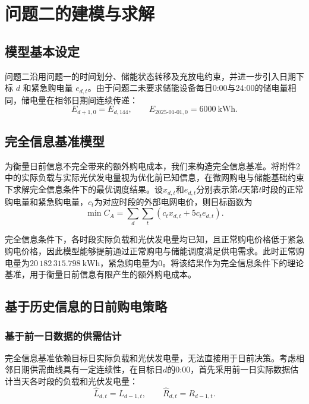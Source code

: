 \section{问题二的建模与求解}

\subsection{模型基本设定}

问题二沿用问题一的时间划分、储能状态转移及充放电约束，并进一步引入日期下标 $d$ 和紧急购电量 $e_{d,t}$。由于问题二未要求储能设备每日0:00与24:00的储电量相同，储电量在相邻日期间连续传递：
\begin{equation}
E_{d+1,0}=E_{d,144},
\qquad
E_{2025\text{-}01\text{-}01,0}=6000\ \mathrm{kWh}.
\label{eq:p2_crossday}
\end{equation}

\subsection{完全信息基准模型}

为衡量日前信息不完全带来的额外购电成本，我们来构造完全信息基准。将附件2中的实际负载与实际光伏发电量视为优化前已知信息，在微网购电与储能基础约束下求解完全信息条件下的最优调度结果。设$x_{d,t}$和$e_{d,t}$分别表示第$d$天第$t$时段的正常购电量和紧急购电量，$c_t$为对应时段的外部电网电价，则目标函数为
\begin{equation}
\min C_A=
\sum_{d}\sum_{t}
\left(c_t x_{d,t}+5c_t e_{d,t}\right).
\label{eq:p2_oracle}
\end{equation}

完全信息条件下，各时段实际负载和光伏发电量均已知，且正常购电价格低于紧急购电价格，因此模型能够提前通过正常购电与储能调度满足供电需求。此时正常购电量为$20\,182\,315.798\ \mathrm{kWh}$，紧急购电量为0。将该结果作为完全信息条件下的理论基准，用于衡量日前信息有限产生的额外购电成本。


\subsection{基于历史信息的日前购电策略}

\subsubsection{基于前一日数据的供需估计}

完全信息基准依赖目标日实际负载和光伏发电量，无法直接用于日前决策。考虑相邻日期供需曲线具有一定连续性，在目标日$d$的0:00，首先采用前一日实际数据估计当天各时段的负载和光伏发电量：
\begin{equation}
\hat L_{d,t}=L_{d-1,t},\qquad
\hat R_{d,t}=R_{d-1,t}.
\label{eq:p2_yesterday}
\end{equation}

